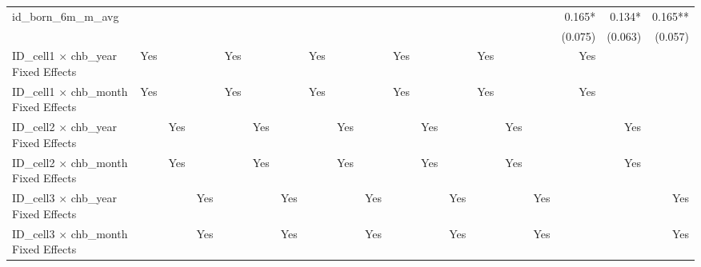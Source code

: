 \begin{tabular}{lrrrrrrrrrrrrrrrrrr}
id\_born\_6m\_m\_avg                        &             &             &             &             &             &             &             &             &             &             &             &             &             &             &             &      0.165* &      0.134* &     0.165** \\ 
                                            &             &             &             &             &             &             &             &             &             &             &             &             &             &             &             &     (0.075) &     (0.063) &     (0.057) \\ 
\midrule
ID\_cell1 $\times$ chb\_year Fixed Effects  &         Yes &             &             &         Yes &             &             &         Yes &             &             &         Yes &             &             &         Yes &             &             &         Yes &             &             \\ 
ID\_cell1 $\times$ chb\_month Fixed Effects &         Yes &             &             &         Yes &             &             &         Yes &             &             &         Yes &             &             &         Yes &             &             &         Yes &             &             \\ 
ID\_cell2 $\times$ chb\_year Fixed Effects  &             &         Yes &             &             &         Yes &             &             &         Yes &             &             &         Yes &             &             &         Yes &             &             &         Yes &             \\ 
ID\_cell2 $\times$ chb\_month Fixed Effects &             &         Yes &             &             &         Yes &             &             &         Yes &             &             &         Yes &             &             &         Yes &             &             &         Yes &             \\ 
ID\_cell3 $\times$ chb\_year Fixed Effects  &             &             &         Yes &             &             &         Yes &             &             &         Yes &             &             &         Yes &             &             &         Yes &             &             &         Yes \\ 
ID\_cell3 $\times$ chb\_month Fixed Effects &             &             &         Yes &             &             &         Yes &             &             &         Yes &             &             &         Yes &             &             &         Yes &             &             &         Yes \\ 

\end{tabular}
